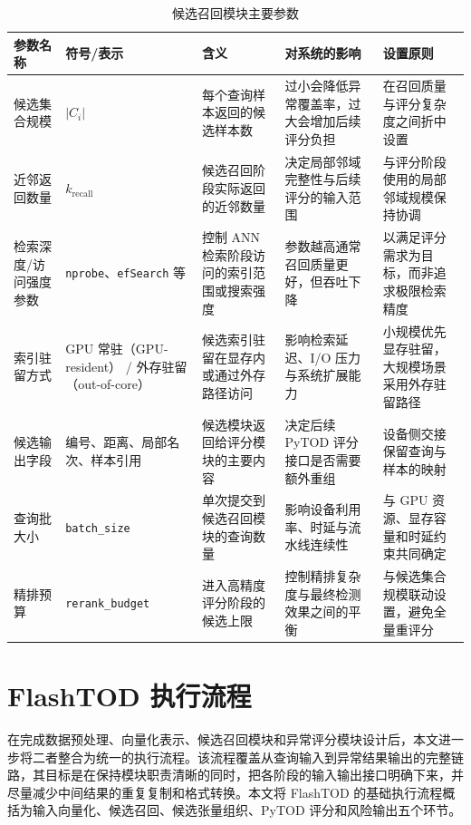 \begin{table}[!htb]
  \caption{候选召回模块主要参数}
  \label{tab:recall-module-params}
  \centering
  \small
  \renewcommand{\arraystretch}{1.2}
  \begin{adjustbox}{max width=\linewidth}
  \begin{tabular}{P{2.6cm}P{2.7cm}P{3.2cm}P{4.2cm}P{4.2cm}}
    \toprule
    参数名称 & 符号/表示 & 含义 & 对系统的影响 & 设置原则\\
    \midrule
    候选集合规模 & $|C_i|$ & 每个查询样本返回的候选样本数 & 过小会降低异常覆盖率，过大会增加后续评分负担 & 在召回质量与评分复杂度之间折中设置\\
    近邻返回数量 & $k_{\mathrm{recall}}$ & 候选召回阶段实际返回的近邻数量 & 决定局部邻域完整性与后续评分的输入范围 & 与评分阶段使用的局部邻域规模保持协调\\
    检索深度/访问强度参数 & \texttt{nprobe}、\texttt{efSearch} 等 & 控制 ANN 检索阶段访问的索引范围或搜索强度 & 参数越高通常召回质量更好，但吞吐下降 & 以满足评分需求为目标，而非追求极限检索精度\\
    索引驻留方式 & GPU 常驻（GPU-resident） / 外存驻留（out-of-core） & 候选索引驻留在显存内或通过外存路径访问 & 影响检索延迟、I/O 压力与系统扩展能力 & 小规模优先显存驻留，大规模场景采用外存驻留路径\\
    候选输出字段 & 编号、距离、局部名次、样本引用 & 候选模块返回给评分模块的主要内容 & 决定后续 PyTOD 评分接口是否需要额外重组 & 设备侧交接保留查询与样本的映射\\
    查询批大小 & \texttt{batch\_size} & 单次提交到候选召回模块的查询数量 & 影响设备利用率、时延与流水线连续性 & 与 GPU 资源、显存容量和时延约束共同确定\\
    精排预算 & \texttt{rerank\_budget} & 进入高精度评分阶段的候选上限 & 控制精排复杂度与最终检测效果之间的平衡 & 与候选集合规模联动设置，避免全量重评分\\
    \bottomrule
  \end{tabular}
  \end{adjustbox}
\end{table}

\FloatBarrier

\section{FlashTOD 执行流程}

在完成数据预处理、向量化表示、候选召回模块和异常评分模块设计后，本文进一步将二者整合为统一的执行流程。该流程覆盖从查询输入到异常结果输出的完整链路，其目标是在保持模块职责清晰的同时，把各阶段的输入输出接口明确下来，并尽量减少中间结果的重复复制和格式转换。本文将 FlashTOD 的基础执行流程概括为输入向量化、候选召回、候选张量组织、PyTOD 评分和风险输出五个环节。

